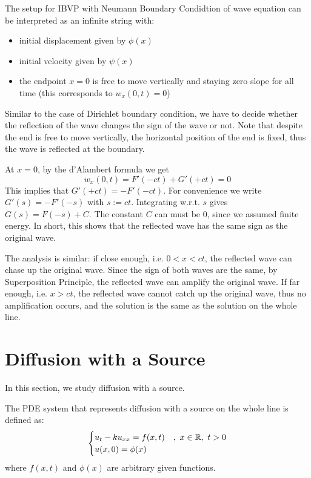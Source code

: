 \medskip 

\begin{re} 
    The setup for IBVP with Neumann Boundary Condidtion of wave equation can be interpreted as an infinite string with:
    \begin{itemize}
        \item initial displacement given by $\phi(x)$
        \item initial velocity given by $\psi(x)$
        \item the endpoint $x=0$ is free to move vertically and staying zero slope for all time (this corresponds to $w_x(0,t) = 0$)
    \end{itemize}
    Similar to the case of Dirichlet boundary condition, we have to decide whether the reflection of the wave changes the sign of the wave or not. Note that despite the end is free to move vertically, the horizontal position of the end is fixed, thus the wave is reflected at the boundary. 

    At $x=0$, by the d'Alambert formula we get 
    \[w_x(0,t) = F'(-ct) + G'(+ct) = 0\]
    This implies that $G'(+ct) = -F'(-ct)$. For convenience we write $G'(s) = -F'(-s)$ with $s:= ct$. Integrating w.r.t. $s$ gives $G(s) = F(-s) + C$. The constant $C$ can must be $0$, since we assumed finite energy. In short, this shows that the reflected wave has the same sign as the original wave.

    The analysis is similar: if close enough, i.e. $0<x<ct$, the reflected wave can chase up the original wave. Since the sign of both waves are the same, by Superposition Principle, the reflected wave can amplify the original wave. If far enough, i.e. $x > ct$, the reflected wave cannot catch up the original wave, thus no amplification occurs, and the solution is the same as the solution on the whole line.
\end{re}

\section{Diffusion with a Source}
In this section, we study diffusion with a source.

\medskip 

\begin{defn} 
    The PDE system that represents diffusion with a source on the whole line is defined as:
    \[\begin{cases}
    u_t - ku_{xx} = f(x,t) &,\ x\in {\mathbb R},\ t>0\\
    u(x,0) = \phi(x)
    \end{cases}\]
    where $f(x,t)$ and $\phi(x)$ are arbitrary given functions.
\end{defn}

